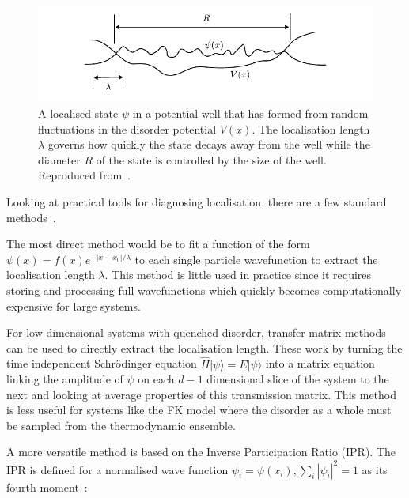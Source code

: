 \hypertarget{fig:localisation_radius_vs_length}{%
\begin{figure}
\centering
\includegraphics[width=1\textwidth,height=\textheight]{figure_code/background_chapter/localisation_radius_vs_length}
\caption[{Localisation length vs diameter}]{A localised state \(\psi\) in a potential well that has formed from random fluctuations in the disorder potential \(V(x)\). The localisation length \(\lambda\) governs how quickly the state decays away from the well while the diameter \(R\) of the state is controlled by the size of the well. Reproduced from~\autocite{kramerLocalizationTheoryExperiment1993}.}
\label{fig:localisation_radius_vs_length}
\end{figure}
}

Looking at practical tools for diagnosing localisation, there are a few standard methods~\autocite{kramerLocalizationTheoryExperiment1993}.

The most direct method would be to fit a function of the form \(\psi(x) = f(x) e^{-|x-x_0|/\lambda}\) to each single particle wavefunction to extract the localisation length \(\lambda\). This method is little used in practice since it requires storing and processing full wavefunctions which quickly becomes computationally expensive for large systems.

For low dimensional systems with quenched disorder, transfer matrix methods can be used to directly extract the localisation length. These work by turning the time independent Schrödinger equation \(\hat{H}|\psi\rangle = E|\psi\rangle\) into a matrix equation linking the amplitude of \(\psi\) on each \(d-1\) dimensional slice of the system to the next and looking at average properties of this transmission matrix. This method is less useful for systems like the FK model where the disorder as a whole must be sampled from the thermodynamic ensemble.

A more versatile method is based on the Inverse Participation Ratio (IPR). The IPR is defined for a normalised wave function \(\psi_i = \psi(x_i), \sum_i |\psi_i|^2 = 1\) as its fourth moment~\autocite{kramerLocalizationTheoryExperiment1993}:

